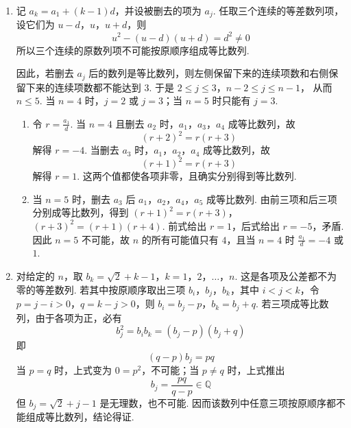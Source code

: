 \begin{solution}
\begin{enumerate}
\item 记 \(a_k=a_1+(k-1)d\)，并设被删去的项为 \(a_j\). 任取三个连续的等差数列项，设它们为 \(u-d\)，\(u\)，\(u+d\)，则
\[
u^2-(u-d)(u+d)=d^2\neq0
\]
所以三个连续的原数列项不可能按原顺序组成等比数列.

因此，若删去 \(a_j\) 后的数列是等比数列，则左侧保留下来的连续项数和右侧保留下来的连续项数都不能达到 \(3\). 于是
\(2\leqslant j\leqslant3\)，\(n-2\leqslant j\leqslant n-1\)，
从而 \(n\leqslant5\). 当 \(n=4\) 时，\(j=2\) 或 \(j=3\)；当 \(n=5\) 时只能有 \(j=3\).

\begin{enumerate}
\item 令 \(r=\frac{a_1}{d}\). 当 \(n=4\) 且删去 \(a_2\) 时，\(a_1\)，\(a_3\)，\(a_4\) 成等比数列，故
\[
(r+2)^2=r(r+3)
\]
解得 \(r=-4\). 当删去 \(a_3\) 时，\(a_1\)，\(a_2\)，\(a_4\) 成等比数列，故
\[
(r+1)^2=r(r+3)
\]
解得 \(r=1\). 这两个值都使各项非零，且确实分别得到等比数列.

\item 当 \(n=5\) 时，删去 \(a_3\) 后 \(a_1\)，\(a_2\)，\(a_4\)，\(a_5\) 成等比数列. 由前三项和后三项分别成等比数列，得到
\((r+1)^2=r(r+3)\)，\((r+3)^2=(r+1)(r+4)\).
前式给出 \(r=1\)，后式给出 \(r=-5\)，矛盾. 因此 \(n=5\) 不可能，故 \(n\) 的所有可能值只有 \(4\)，且当 \(n=4\) 时 \(\frac{a_1}{d}=-4\) 或 \(1\).
\end{enumerate}

\item 对给定的 \(n\)，取
\(b_k=\sqrt{2}+k-1\)，\(k=1\)，\(2\)，\(\ldots\)，\(n\).
这是各项及公差都不为零的等差数列. 若其中按原顺序取出三项 \(b_i\)，\(b_j\)，\(b_k\)，其中 \(i<j<k\)，令 \(p=j-i>0\)，\(q=k-j>0\)，则
\(b_i=b_j-p\)，\(b_k=b_j+q\). 若三项成等比数列，由于各项为正，必有
\[
b_j^2=b_i b_k=(b_j-p)(b_j+q)
\]
即
\[
(q-p)b_j=pq
\]
当 \(p=q\) 时，上式变为 \(0=p^2\)，不可能；当 \(p\neq q\) 时，上式推出
\[
b_j=\frac{pq}{q-p}\in\mathbb{Q}
\]
但 \(b_j=\sqrt{2}+j-1\) 是无理数，也不可能. 因而该数列中任意三项按原顺序都不能组成等比数列，结论得证.
\end{enumerate}
\end{solution}

